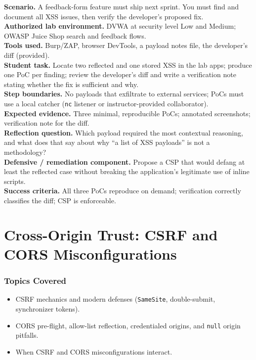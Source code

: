 \documentclass[11pt,letterpaper,oneside]{report}
\newcommand{\tool}[1]{\texttt{\small #1}}
\begin{document}
\begin{labbox}
\textbf{Scenario.} A feedback-form feature must ship next sprint. You must find and document all XSS issues, then verify the developer's proposed fix.\\[3pt]
\textbf{Authorized lab environment.} DVWA at security level Low and Medium; OWASP Juice Shop search and feedback flows.\\[3pt]
\textbf{Tools used.} Burp/ZAP, browser DevTools, a payload notes file, the developer's diff (provided).\\[3pt]
\textbf{Student task.} Locate two reflected and one stored XSS in the lab apps; produce one PoC per finding; review the developer's diff and write a verification note stating whether the fix is sufficient and why.\\[3pt]
\textbf{Step boundaries.} No payloads that exfiltrate to external services; PoCs must use a local catcher (\tool{nc} listener or instructor-provided collaborator).\\[3pt]
\textbf{Expected evidence.} Three minimal, reproducible PoCs; annotated screenshots; verification note for the diff.\\[3pt]
\textbf{Reflection question.} Which payload required the most contextual reasoning, and what does that say about why ``a list of XSS payloads'' is not a methodology?\\[3pt]
\textbf{Defensive / remediation component.} Propose a CSP that would defang at least the reflected case without breaking the application's legitimate use of inline scripts.\\[3pt]
\textbf{Success criteria.} All three PoCs reproduce on demand; verification correctly classifies the diff; CSP is enforceable.
\end{labbox}

\chapter{Cross-Origin Trust: CSRF and CORS Misconfigurations}

\subsection*{Topics Covered}
\begin{itemize}
  \item CSRF mechanics and modern defenses (\tool{SameSite}, double-submit, synchronizer tokens).
  \item CORS pre-flight, allow-list reflection, credentialed origins, and \tool{null} origin pitfalls.
  \item When CSRF and CORS misconfigurations interact.
\end{itemize}
\end{document}
